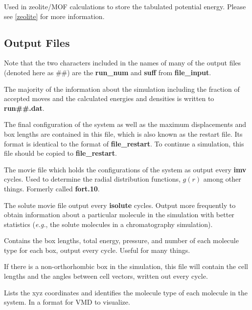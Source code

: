 \documentclass[12pt,letterpaper]{article}
\begin{document}
 Used in zeolite/MOF calculations
to store the tabulated potential energy. Please see
\ref{zeolite} for more information.

\subsection{Output Files}
\label{output}
Note that the two characters included in the names of many
of the output files (denoted here as \#\#) are the {\bf
  run\_num} and {\bf suff} from {\bf file\_input}.

 The majority of the information
about the simulation including the fraction of accepted
moves and the calculated energies and densities is written
to {\bf run\#\#.dat}.

 The final configuration of the
system as well as the maximum displacements and box lengths
are contained in this file, which is also known as the
restart file. Its format is identical to the format of {\bf
  file\_restart}. To continue a simulation, this file should
be copied to {\bf file\_restart}.

 The movie file which holds the
configurations of the system as output every {\bf imv}
cycles. Used to determine the radial distribution functions,
$g(r)$ among other things. Formerly called {\bf fort.10}.

 The solute movie file output
every {\bf isolute} cycles. Output more frequently to obtain
information about a particular molecule in the simulation
with better statistics ({\it e.g.}, the solute molecules in
a chromatography simulation).

 Contains the box lengths, total
energy, pressure, and number of each molecule type for each
box, output every cycle. Useful for many things.

 If there is a
non-orthorhombic box in the simulation, this file will
contain the cell lengths and the angles between cell
vectors, written out every cycle.

 Lists the xyz coordinates
and identifies the molecule type of each molecule in the
system. In a format for VMD to visualize.
\end{document}
